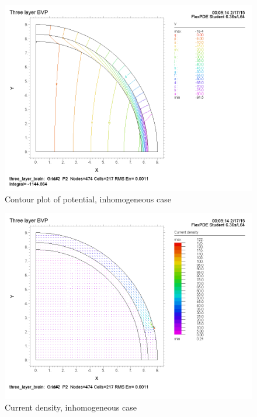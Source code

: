 \documentclass{article}
\begin{document}
\begin{figure}[H]
    \begin{center}
        \includegraphics[scale=0.5]{contourV.png}
        \caption{Contour plot of potential, inhomogeneous case}
    \end{center}
\end{figure}

\begin{figure}[H]
    \begin{center}
        \includegraphics[scale=0.5]{CD.png}
        \caption{Current density, inhomogeneous case}
    \end{center}
\end{figure}
\end{document}
